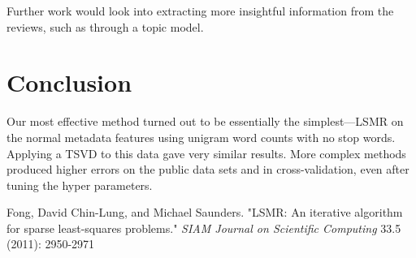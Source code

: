 \documentclass[11pt]{amsart}
\begin{document}
Further work would look into extracting more insightful information from the reviews, such as through a topic model.

\section{Conclusion}

Our most effective method turned out to be essentially the simplest---LSMR on the normal metadata features using unigram word counts with no stop words. Applying a TSVD to this data gave very similar results. More complex methods produced higher errors on the public data sets and in cross-validation, even after tuning the hyper parameters.

\begingroup
\begin{thebibliography}{9}

Fong, David Chin-Lung, and Michael Saunders. "LSMR: An iterative algorithm for sparse least-squares problems."
\emph{SIAM Journal on Scientific Computing} 33.5 (2011): 2950-2971

\end{thebibliography}
\endgroup
\end{document}

